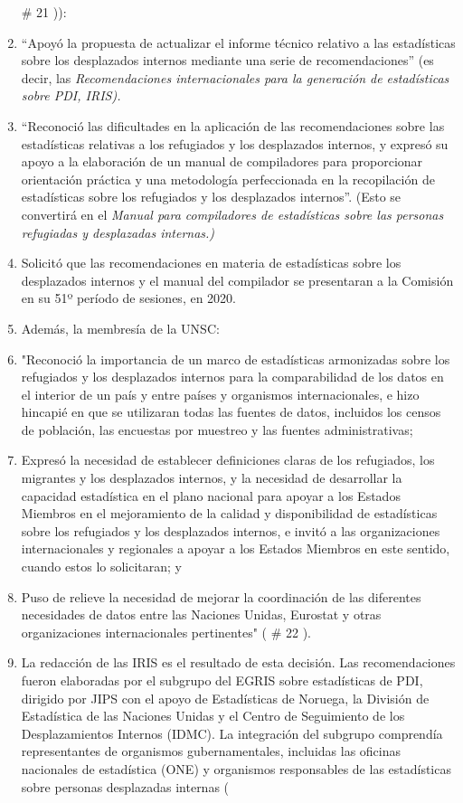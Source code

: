 \documentclass[
]{book}
\begin{document}
\begin{enumerate}
  \# 21
  )):
\item
  ``Apoyó la propuesta de actualizar el informe técnico relativo a las estadísticas sobre los desplazados internos mediante una serie de recomendaciones'' (es decir, las \emph{Recomendaciones internacionales para la generación de estadísticas sobre PDI, IRIS).}
\item
  ``Reconoció las dificultades en la aplicación de las recomendaciones sobre las estadísticas relativas a los refugiados y los desplazados internos, y expresó su apoyo a la elaboración de un manual de compiladores para proporcionar orientación práctica y una metodología perfeccionada en la recopilación de estadísticas sobre los refugiados y los desplazados internos''. (Esto se convertirá en el \emph{Manual para compiladores de estadísticas sobre las personas refugiadas y desplazadas internas.)}
\item
  Solicitó que las recomendaciones en materia de estadísticas sobre los desplazados internos y el manual del compilador se presentaran a la Comisión en su 51º período de sesiones, en 2020.
\item
  Además, la membresía de la UNSC:
\item
  "Reconoció la importancia de un marco de estadísticas armonizadas sobre los refugiados y los desplazados internos para la comparabilidad de los datos en el interior de un país y entre países y organismos internacionales, e hizo hincapié en que se utilizaran todas las fuentes de datos, incluidos los censos de población, las encuestas por muestreo y las fuentes administrativas;
\item
  Expresó la necesidad de establecer definiciones claras de los refugiados, los migrantes y los desplazados internos, y la necesidad de desarrollar la capacidad estadística en el plano nacional para apoyar a los Estados Miembros en el mejoramiento de la calidad y disponibilidad de estadísticas sobre los refugiados y los desplazados internos, e invitó a las organizaciones internacionales y regionales a apoyar a los Estados Miembros en este sentido, cuando estos lo solicitaran; y
\item
  Puso de relieve la necesidad de mejorar la coordinación de las diferentes necesidades de datos entre las Naciones Unidas, Eurostat y otras organizaciones internacionales pertinentes" (
  \# 22
  ).
\item
  La redacción de las IRIS es el resultado de esta decisión. Las recomendaciones fueron elaboradas por el subgrupo del EGRIS sobre estadísticas de PDI, dirigido por JIPS con el apoyo de Estadísticas de Noruega, la División de Estadística de las Naciones Unidas y el Centro de Seguimiento de los Desplazamientos Internos (IDMC). La integración del subgrupo comprendía representantes de organismos gubernamentales, incluidas las oficinas nacionales de estadística (ONE) y organismos responsables de las estadísticas sobre personas desplazadas internas (

\end{enumerate}
\end{document}

